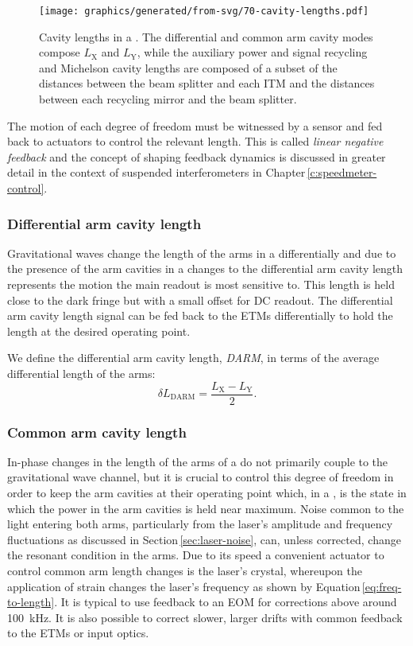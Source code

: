 \begin{figure}
  \centering
  \texttt{[image: graphics/generated/from-svg/70-cavity-lengths.pdf]}
  \caption[Cavity lengths in a \DRFPMI{}]{\label{fig:et-lf-cavity-lengths}Cavity lengths in a \DRFPMI{}. The differential and common arm cavity modes compose $L_{\text{X}}$ and $L_{\text{Y}}$, while the auxiliary power and signal recycling and Michelson cavity lengths are composed of a subset of the distances between the beam splitter and each \gls{ITM} and the distances between each recycling mirror and the beam splitter.}
\end{figure}

The motion of each degree of freedom must be witnessed by a sensor and fed back to actuators to control the relevant length. This is called \emph{linear negative feedback} and the concept of shaping feedback dynamics is discussed in greater detail in the context of suspended interferometers in Chapter\,\ref{c:speedmeter-control}.

\subsubsection{Differential arm cavity length}
Gravitational waves change the length of the arms in a \MI{} differentially and due to the presence of the arm cavities in a \DRFPMI{} changes to the differential arm cavity length represents the motion the main readout is most sensitive to. This length is held close to the dark fringe but with a small offset for \gls{DC} readout. The differential arm cavity length signal can be fed back to the \glspl{ETM} differentially to hold the length at the desired operating point.

We define the differential arm cavity length, \emph{\gls{DARM}}, in terms of the average differential length of the arms:
\begin{equation}
  \label{eq:darm-length}
  \delta L_{\text{DARM}} = \frac{L_{\text{X}} - L_{\text{Y}}}{2}.
\end{equation}

\subsubsection{Common arm cavity length}
In-phase changes in the length of the arms of a \MI{} do not primarily couple to the gravitational wave channel, but it is crucial to control this degree of freedom in order to keep the arm cavities at their operating point which, in a \DRFPMI{}, is the state in which the power in the arm cavities is held near maximum. Noise common to the light entering both arms, particularly from the laser's amplitude and frequency fluctuations as discussed in Section\,\ref{sec:laser-noise}, can, unless corrected, change the resonant condition in the arms. Due to its speed a convenient actuator to control common arm length changes is the laser's crystal, whereupon the application of strain changes the laser's frequency as shown by Equation\,\ref{eq:freq-to-length}. It is typical to use feedback to an \gls{EOM} for corrections above around \SI{100}{\kilo\hertz}. It is also possible to correct slower, larger drifts with common feedback to the \glspl{ETM} or input optics.


